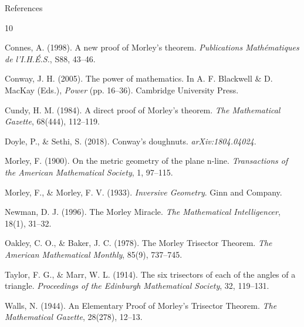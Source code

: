 \documentclass[aspectratio=169,10pt]{beamer}
\begin{document}
\begin{frame}[allowframebreaks]{References}
\small\begin{thebibliography}{10}

Connes, A. (1998).
\newblock A new proof of Morley’s theorem.
\newblock \emph{Publications Math\'{e}matiques de l’I.H.\'{E}.S.}, S88, 43--46.

Conway, J. H. (2005).
\newblock The power of mathematics.
\newblock In A. F. Blackwell \& D. MacKay (Eds.), \emph{Power} (pp. 16--36). Cambridge University Press.

Cundy, H. M. (1984).
\newblock A direct proof of Morley’s theorem.
\newblock \emph{The Mathematical Gazette}, 68(444), 112--119.

Doyle, P., \& Sethi, S. (2018).
\newblock Conway’s doughnuts.
\newblock \emph{arXiv:1804.04024}.

Morley, F. (1900).
\newblock On the metric geometry of the plane n-line.
\newblock \emph{Transactions of the American Mathematical Society}, 1, 97--115.

Morley, F., \& Morley, F. V. (1933).
\newblock \emph{Inversive Geometry}.
\newblock Ginn and Company.

Newman, D. J. (1996).
\newblock The Morley Miracle.
\newblock \emph{The Mathematical Intelligencer}, 18(1), 31--32.

Oakley, C. O., \& Baker, J. C. (1978).
\newblock The Morley Trisector Theorem.
\newblock \emph{The American Mathematical Monthly}, 85(9), 737--745.

Taylor, F. G., \& Marr, W. L. (1914).
\newblock The six trisectors of each of the angles of a triangle.
\newblock \emph{Proceedings of the Edinburgh Mathematical Society}, 32, 119--131.

Walls, N. (1944).
\newblock An Elementary Proof of Morley’s Trisector Theorem.
\newblock \emph{The Mathematical Gazette}, 28(278), 12--13.

\end{thebibliography}
\end{frame}
\end{document}
